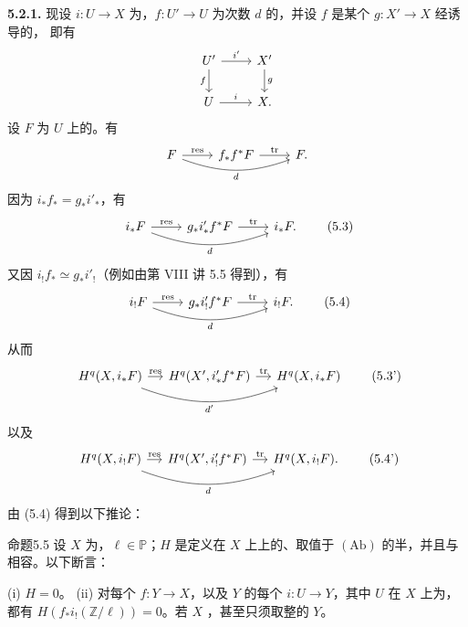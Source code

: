 \textbf{5.2.1.} 现设 $i:U\to X$ 为，$f:U'\to U$ 为次数 $d$ 的，并设 $f$ 是某个 $g:X'\to X$ 经诱导的，
即有
\[
\begin{tikzcd}
U'\arrow[r,"i'"]\arrow[d,"f"']&X'\arrow[d,"g"]\\
U\arrow[r,"i"]&X.
\end{tikzcd}
\]
设 $F$ 为 $U$ 上的。有
\[
\begin{tikzcd}
F\arrow[r,"\mathrm{res}"]\arrow[rr,bend right=20,"d"']&f_*f^*F\arrow[r,"\mathrm{tr}"]&F.
\end{tikzcd}
\]
因为 $i_*f_*=g_*i'_*$，有
\[
\begin{tikzcd}
i_*F\arrow[r,"\mathrm{res}"]\arrow[rr,bend right=20,"d"']&g_*i'_*f^*F\arrow[r,"\mathrm{tr}"]&i_*F.
\end{tikzcd}
\tag{5.3}
\]
又因 $i_!f_*\simeq g_*i'_!$（例如由第 VIII 讲 5.5 得到），有
\[
\begin{tikzcd}
i_!F\arrow[r,"\mathrm{res}"]\arrow[rr,bend right=20,"d"']&g_*i'_!f^*F\arrow[r,"\mathrm{tr}"]&i_!F.
\end{tikzcd}
\tag{5.4}
\]
从而
\[
\begin{tikzcd}[column sep=small]
H^q(X,i_*F)\arrow[r,"\mathrm{res}"]\arrow[rr,bend right=20,"d'"']&H^q(X',i'_*f^*F)\arrow[r,"\mathrm{tr}"]&H^q(X,i_*F)
\end{tikzcd}
\tag{5.3'}
\]
以及
\[
\begin{tikzcd}[column sep=small]
H^q(X,i_!F)\arrow[r,"\mathrm{res}"]\arrow[rr,bend right=20,"d"']&H^q(X',i'_!f^*F)\arrow[r,"\mathrm{tr}"]&H^q(X,i_!F).
\end{tikzcd}
\tag{5.4'}
\]
由 (5.4) 得到以下推论：
\begin{SGAresult}{命题}{5.5}
设 $X$ 为，$\ell\in\mathbb P$；$H$ 是定义在 $X$ 上上的、取值于 $(\mathrm{Ab})$ 的半，并且与相容。以下断言：

(i) $H=0$。
(ii) 对每个 $f:Y\to X$，以及 $Y$ 的每个 $i:U\to Y$，其中 $U$ 在 $X$ 上为，都有 $H(f_*i_!(\mathbb Z/\ell))=0$。若 $X$ ，甚至只须取整的 $Y$。
\end{SGAresult}
